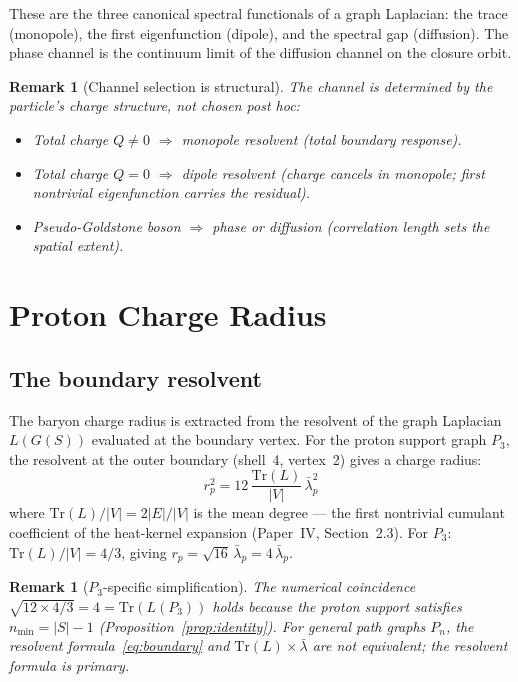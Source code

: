 \documentclass[12pt]{article}
\newtheorem{remark}[theorem]{Remark}
\newcommand{\lbar}{\bar{\lambda}}
\begin{document}
These are the three canonical spectral functionals of a graph Laplacian: the trace (monopole), the first eigenfunction (dipole), and the spectral gap (diffusion). The phase channel is the continuum limit of the diffusion channel on the closure orbit.

\begin{remark}[Channel selection is structural]
The channel is determined by the particle's charge structure, not chosen post hoc:
\begin{itemize}
    \item Total charge $Q \neq 0$ $\Rightarrow$ monopole resolvent (total boundary response).
    \item Total charge $Q = 0$ $\Rightarrow$ dipole resolvent (charge cancels in monopole; first nontrivial eigenfunction carries the residual).
    \item Pseudo-Goldstone boson $\Rightarrow$ phase or diffusion (correlation length sets the spatial extent).
\end{itemize}
\end{remark}

\section{Proton Charge Radius}\label{sec:proton}

\subsection{The boundary resolvent}

The baryon charge radius is extracted from the resolvent of the graph Laplacian $L(G(S))$ evaluated at the boundary vertex. For the proton support graph $P_3$, the resolvent at the outer boundary (shell~4, vertex~2) gives a charge radius:
\begin{equation}\label{eq:boundary}
    r_p^2 = 12\,\frac{\mathrm{Tr}(L)}{|V|}\,\lbar_p^2
\end{equation}
where $\mathrm{Tr}(L)/|V| = 2|E|/|V|$ is the mean degree --- the first nontrivial cumulant coefficient of the heat-kernel expansion (Paper~IV, Section~2.3). For $P_3$: $\mathrm{Tr}(L)/|V| = 4/3$, giving $r_p = \sqrt{16}\,\lbar_p = 4\,\lbar_p$.

\begin{remark}[$P_3$-specific simplification]
The numerical coincidence $\sqrt{12 \times 4/3} = 4 = \mathrm{Tr}(L(P_3))$ holds because the proton support satisfies $n_{\min} = |S| - 1$ (Proposition~\ref{prop:identity}). For general path graphs $P_n$, the resolvent formula~\eqref{eq:boundary} and $\mathrm{Tr}(L) \times \lbar$ are not equivalent; the resolvent formula is primary.
\end{remark}
\end{document}
